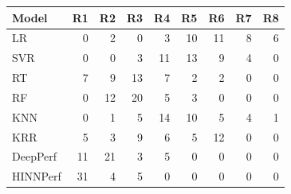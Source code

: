 \begin{tabular}{lrrrrrrrr}
\toprule
Model & R1 & R2 & R3 & R4 & R5 & R6 & R7 & R8 \\
\midrule
LR & 0 & 2 & 0 & 3 & 10 & 11 & 8 & 6 \\
SVR & 0 & 0 & 3 & 11 & 13 & 9 & 4 & 0 \\
RT & 7 & 9 & 13 & 7 & 2 & 2 & 0 & 0 \\
RF & 0 & 12 & 20 & 5 & 3 & 0 & 0 & 0 \\
KNN & 0 & 1 & 5 & 14 & 10 & 5 & 4 & 1 \\
KRR & 5 & 3 & 9 & 6 & 5 & 12 & 0 & 0 \\
DeepPerf & 11 & 21 & 3 & 5 & 0 & 0 & 0 & 0 \\
HINNPerf & 31 & 4 & 5 & 0 & 0 & 0 & 0 & 0 \\
\bottomrule
\end{tabular}
